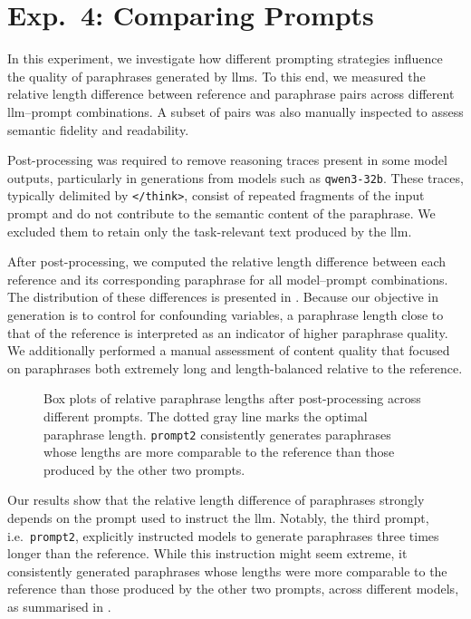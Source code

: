 \section{Exp.\ 4: Comparing Prompts}%
\label{sec:prompt_impact_res}

In this experiment, we investigate how different prompting strategies influence the quality of paraphrases generated by \acp{llm}. 
To this end, we measured the relative length difference between reference and paraphrase pairs across different \ac{llm}–prompt combinations. 
A subset of pairs was also manually inspected to assess semantic fidelity and readability.

Post-processing was required to remove reasoning traces present in some model outputs, particularly in generations from models such as \texttt{qwen3-32b}. 
These traces, typically delimited by \texttt{</think>}, consist of repeated fragments of the input prompt and do not contribute to the semantic content of the paraphrase. 
We excluded them to retain only the task-relevant text produced by the \ac{llm}.

After post-processing, we computed the relative length difference between each reference and its corresponding paraphrase for all model–prompt combinations. 
The distribution of these differences is presented in . 
Because our objective in \imp{} generation is to control for confounding variables, a paraphrase length close to that of the reference is interpreted as an indicator of higher paraphrase quality. 
We additionally performed a manual assessment of content quality that focused on paraphrases both extremely long and length-balanced relative to the reference.

\begin{figure}[H]
    \centering
    
    \caption[Impact of different prompts on paraphrases]{
    Box plots of relative paraphrase lengths after post-processing across different prompts.    
    The dotted gray line marks the optimal paraphrase length.
    \texttt{prompt2} consistently generates paraphrases whose lengths are more comparable to the reference than those produced by the other two prompts.
    }
    \label{fig:prompt_impact_post_processed}
\end{figure}

Our results show that the relative length difference of paraphrases strongly depends on the prompt used to instruct the \ac{llm}. 
Notably, the third prompt, i.e.\ \texttt{prompt2}, explicitly instructed models to generate paraphrases three times longer than the reference. 
While this instruction might seem extreme, it consistently generated paraphrases whose lengths were more comparable to the reference than those produced by the other two prompts, across different models, as summarised in .

